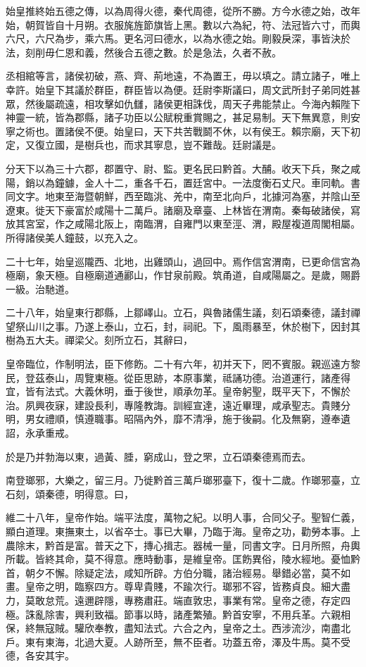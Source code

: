 始皇推終始五德之傳，以為周得火德，秦代周德，從所不勝。方今水德之始，改年始，朝賀皆自十月朔。衣服旄旌節旗皆上黑。數以六為紀，符、法冠皆六寸，而輿六尺，六尺為步，乘六馬。更名河曰德水，以為水德之始。剛毅戾深，事皆決於法，刻削毋仁恩和義，然後合五德之數。於是急法，久者不赦。

丞相綰等言，諸侯初破，燕、齊、荊地遠，不為置王，毋以填之。請立諸子，唯上幸許。始皇下其議於群臣，群臣皆以為便。廷尉李斯議曰，周文武所封子弟同姓甚眾，然後屬疏遠，相攻擊如仇讎，諸侯更相誅伐，周天子弗能禁止。今海內賴陛下神靈一統，皆為郡縣，諸子功臣以公賦稅重賞賜之，甚足易制。天下無異意，則安寧之術也。置諸侯不便。始皇曰，天下共苦戰鬬不休，以有侯王。賴宗廟，天下初定，又復立國，是樹兵也，而求其寧息，豈不難哉。廷尉議是。

分天下以為三十六郡，郡置守、尉、監。更名民曰黔首。大酺。收天下兵，聚之咸陽，銷以為鐘鐻，金人十二，重各千石，置廷宮中。一法度衡石丈尺。車同軌。書同文字。地東至海暨朝鮮，西至臨洮、羌中，南至北向戶，北據河為塞，并陰山至遼東。徙天下豪富於咸陽十二萬戶。諸廟及章臺、上林皆在渭南。秦每破諸侯，寫放其宮室，作之咸陽北阪上，南臨渭，自雍門以東至涇、渭，殿屋複道周閣相屬。所得諸侯美人鐘鼓，以充入之。

二十七年，始皇巡隴西、北地，出雞頭山，過回中。焉作信宮渭南，已更命信宮為極廟，象天極。自極廟道通酈山，作甘泉前殿。筑甬道，自咸陽屬之。是歲，賜爵一級。治馳道。

二十八年，始皇東行郡縣，上鄒嶧山。立石，與魯諸儒生議，刻石頌秦德，議封禪望祭山川之事。乃遂上泰山，立石，封，祠祀。下，風雨暴至，休於樹下，因封其樹為五大夫。禪梁父。刻所立石，其辭曰，

皇帝臨位，作制明法，臣下修飭。二十有六年，初并天下，罔不賓服。親巡遠方黎民，登茲泰山，周覽東極。從臣思跡，本原事業，祗誦功德。治道運行，諸產得宜，皆有法式。大義休明，垂于後世，順承勿革。皇帝躬聖，既平天下，不懈於治。夙興夜寐，建設長利，專隆教誨。訓經宣達，遠近畢理，咸承聖志。貴賤分明，男女禮順，慎遵職事。昭隔內外，靡不清凈，施于後嗣。化及無窮，遵奉遺詔，永承重戒。

於是乃并勃海以東，過黃、腄，窮成山，登之罘，立石頌秦德焉而去。

南登瑯邪，大樂之，留三月。乃徙黔首三萬戶瑯邪臺下，復十二歲。作瑯邪臺，立石刻，頌秦德，明得意。曰，

維二十八年，皇帝作始。端平法度，萬物之紀。以明人事，合同父子。聖智仁義，顯白道理。東撫東土，以省卒士。事已大畢，乃臨于海。皇帝之功，勸勞本事。上農除末，黔首是富。普天之下，摶心揖志。器械一量，同書文字。日月所照，舟輿所載。皆終其命，莫不得意。應時動事，是維皇帝。匡飭異俗，陵水經地。憂恤黔首，朝夕不懈。除疑定法，咸知所辟。方伯分職，諸治經易。舉錯必當，莫不如畫。皇帝之明，臨察四方。尊卑貴賤，不踰次行。瑯邪不容，皆務貞良。細大盡力，莫敢怠荒。遠邇辟隱，專務肅莊。端直敦忠，事業有常。皇帝之德，存定四極。誅亂除害，興利致福。節事以時，諸產繁殖。黔首安寧，不用兵革。六親相保，終無寇賊。驩欣奉教，盡知法式。六合之內，皇帝之土。西涉流沙，南盡北戶。東有東海，北過大夏。人跡所至，無不臣者。功蓋五帝，澤及牛馬。莫不受德，各安其宇。

